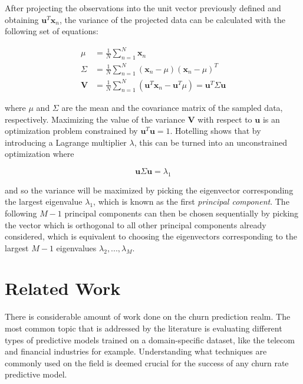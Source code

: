 \documentclass{kththesis}
\begin{document}
After projecting the observations into the unit vector previously defined and obtaining $\mathbf{u}^T\mathbf{x}_n$, the variance of the projected data can be calculated with the following set of equations:

\begin{equation}
\begin{aligned}
\mu &= \frac{1}{N}\sum_{n=1}^N \mathbf{x}_n \\
\Sigma &= \frac{1}{N}\sum_{n=1}^N (\mathbf{x}_n - \mu)(\mathbf{x}_n - \mu)^T \\
\mathbf{V} &= \frac{1}{N}\sum_{n=1}^N (\mathbf{u}^T\mathbf{x}_n - \mathbf{u}^T\mu) = \mathbf{u}^T\Sigma\mathbf{u}
\end{aligned}
\end{equation}

where $\mu$ and $\Sigma$ are the mean and the covariance matrix of the sampled data, respectively. Maximizing the value of the variance $\mathbf{V}$ with respect to $\mathbf{u}$ is an optimization problem constrained by $\mathbf{u}^T \mathbf{u}=1$. Hotelling\citep{hotelling1933analysis} shows that by introducing a Lagrange multiplier $\lambda$, this can be turned into an unconstrained optimization where

\begin{equation}
\mathbf{u}\Sigma\mathbf{u} = \lambda_1
\end{equation}
	
and so the variance will be maximized by picking the eigenvector corresponding the largest eigenvalue $\lambda_1$, which is known as the first \emph{principal component}. The following $M-1$ principal components can then be chosen sequentially by picking the vector which is orthogonal to all other principal components already considered, which is equivalent to choosing the eigenvectors corresponding to the largest $M-1$ eigenvalues $\lambda_2,..., \lambda_M$.

\chapter{Related Work}
\label{cha:related_work}

There is considerable amount of work done on the churn prediction realm. The most common topic that is addressed by the literature is evaluating different types of predictive models trained on a domain-specific dataset, like the telecom and financial industries for example. Understanding what techniques are commonly used on the field is deemed crucial for the success of any churn rate predictive model.
\end{document}
